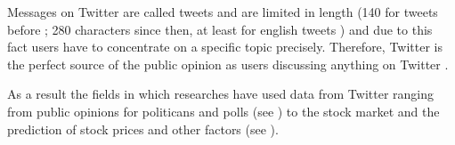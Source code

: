 Messages on Twitter are called tweets and are limited in length (140 for tweets before ; 280 characters since then, at least for english tweets \cite{Rosen2017}) and due to this fact users have to concentrate on a specific topic precisely.
Therefore, Twitter is the perfect source of the public opinion as users discussing anything on Twitter \cite{Pagolu2016a}.

As a result the fields in which researches have used data from Twitter ranging from public opinions for politicans and polls (see \cite{Oconnor2010a,Patodkar2016a}) to the stock market and the prediction of stock prices and other factors (see \cite{Bollen2011a,Mittal2012a,Nguyen2015a,Pagolu2016a,Zhang2011a}).

